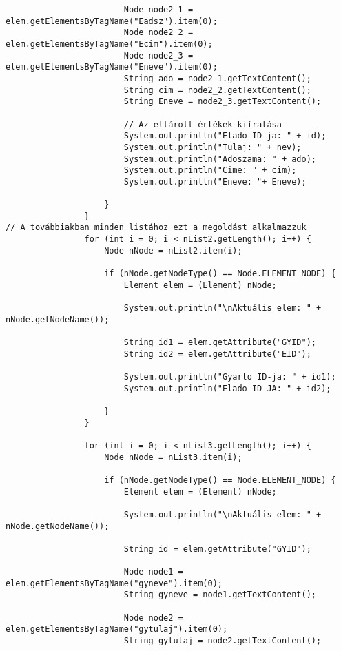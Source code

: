 \documentclass[14pt]{extarticle}
\begin{document}
\begin{normalsize}
\begin{verbatim}
		                Node node2_1 = elem.getElementsByTagName("Eadsz").item(0);
		                Node node2_2 = elem.getElementsByTagName("Ecim").item(0);
		                Node node2_3 = elem.getElementsByTagName("Eneve").item(0);
		                String ado = node2_1.getTextContent();
						String cim = node2_2.getTextContent();
		                String Eneve = node2_3.getTextContent();

		                // Az eltárolt értékek kiíratása
		                System.out.println("Elado ID-ja: " + id);
						System.out.println("Tulaj: " + nev);
		                System.out.println("Adoszama: " + ado);
		                System.out.println("Cime: " + cim);
		                System.out.println("Eneve: "+ Eneve);

		            }
		        }
// A továbbiakban minden listához ezt a megoldást alkalmazzuk		        
		        for (int i = 0; i < nList2.getLength(); i++) {
		            Node nNode = nList2.item(i);

		            if (nNode.getNodeType() == Node.ELEMENT_NODE) {
		                Element elem = (Element) nNode;

		                System.out.println("\nAktuális elem: " + nNode.getNodeName());

		                String id1 = elem.getAttribute("GYID");
		                String id2 = elem.getAttribute("EID");

		                System.out.println("Gyarto ID-ja: " + id1);
		                System.out.println("Elado ID-JA: " + id2);

		            }
		        }
		        
		        for (int i = 0; i < nList3.getLength(); i++) {
		            Node nNode = nList3.item(i);

		            if (nNode.getNodeType() == Node.ELEMENT_NODE) {
		                Element elem = (Element) nNode;

		                System.out.println("\nAktuális elem: " + nNode.getNodeName());

		                String id = elem.getAttribute("GYID");

		                Node node1 = elem.getElementsByTagName("gyneve").item(0);
		                String gyneve = node1.getTextContent();
		                
		                Node node2 = elem.getElementsByTagName("gytulaj").item(0);
		                String gytulaj = node2.getTextContent();
		                

\end{verbatim}
\end{normalsize}
\end{document}
